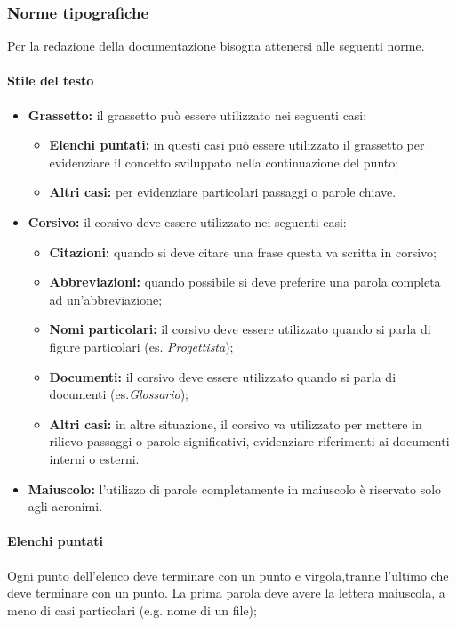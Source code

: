 	\subsubsection{Norme tipografiche} 
	Per la redazione della documentazione bisogna attenersi alle seguenti norme.
		
		\paragraph{Stile del testo}
		\begin{itemize}
		\item \textbf{Grassetto:} il grassetto può essere utilizzato nei seguenti casi:
			\begin{itemize}
			\item \textbf{Elenchi puntati:} in questi casi può essere utilizzato il grassetto per evidenziare il concetto sviluppato nella continuazione del punto;
			\item \textbf{Altri casi:} per evidenziare particolari passaggi o parole chiave.
			\end{itemize}
		
		\item \textbf{Corsivo:} il corsivo deve essere utilizzato nei seguenti casi:
			\begin{itemize}
				\item \textbf{Citazioni:} quando si deve citare una frase questa va scritta in corsivo;
				\item \textbf{Abbreviazioni:} quando possibile si deve preferire una parola completa ad un’abbreviazione;
				\item \textbf{Nomi particolari:} il corsivo deve essere utilizzato quando si parla di figure particolari (es. \textit{Progettista});
				\item \textbf{Documenti:} il corsivo deve essere utilizzato quando si parla di documenti (es.\textit{Glossario});
				\item \textbf{Altri casi:} in altre situazione, il corsivo va utilizzato per mettere in rilievo passaggi o parole significativi, evidenziare riferimenti ai documenti interni o esterni.
			\end{itemize}
		
		\item \textbf{Maiuscolo:} l’utilizzo di parole completamente in maiuscolo è riservato solo agli acronimi.
		
		\end{itemize}
		
		\paragraph{Elenchi puntati} \Spazio
		Ogni punto dell’elenco deve terminare con un punto e virgola,tranne l’ultimo che deve terminare con un punto. La prima parola deve avere la lettera maiuscola, a meno di casi particolari (e.g. nome di un file);
		
